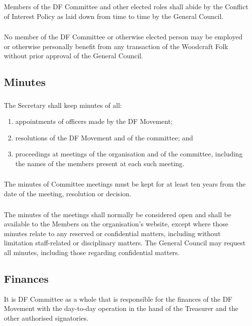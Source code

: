\documentclass[a4paper, 11pt]{report}
\begin{document}
\subsubsection{}
Members of the DF Committee and other elected roles shall abide by the Conflict of Interest Policy as laid down from time to time by the General Council.
\subsubsection{}
No member of the DF Committee or otherwise elected person may be employed or otherwise personally benefit from any transaction of the Woodcraft Folk without prior approval of the General Council.

\subsection{Minutes}
\subsubsection{}
The Secretary shall keep minutes of all:
\begin{enumerate}[\hspace{0.5cm}(a)]
\item appointments of officers made by the DF Movement;
\item resolutions of the DF Movement and of the committee; and
\item proceedings at meetings of the organisation and of the committee, including the names of the members present at each such meeting.
\end{enumerate}
\subsubsection{}
The minutes of Committee meetings must be kept for at least ten years from the date of the meeting, resolution or decision.
\subsubsection{}
The minutes of the meetings shall normally be considered open and shall be available to the Members on the organisation's website, except where those minutes relate to any reserved or confidential matters, including without limitation staff-related or disciplinary matters. The General Council may request all minutes, including those regarding confidential matters.

\subsection{Finances}
It is DF Committee as a whole that is responsible for the finances of the DF Movement with
the day-to-day operation in the hand of the Treasurer and the other authorised signatories.
\end{document}
